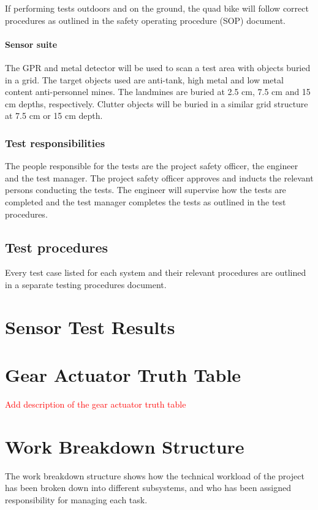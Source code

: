 \documentclass[main.tex]{subfiles}
\begin{document}
\begin{appendices}
If performing tests outdoors and on the ground, the quad bike will follow correct procedures as outlined in the safety operating procedure (SOP) document. 

\subsubsection{Sensor suite}
The GPR and metal detector will be used to scan a test area with objects buried in a grid. The target objects used are anti-tank, high metal and low metal content anti-personnel mines. The landmines are buried at 2.5 cm, 7.5 cm and 15 cm depths,  respectively. Clutter objects will be buried in a similar grid structure at 7.5 cm or 15 cm depth.

\subsection{Test responsibilities}
The people responsible for the tests are the project safety officer, the engineer and the test manager. The project safety officer approves and inducts the relevant persons conducting the tests. The engineer will supervise how the tests are completed and the test manager completes the tests as outlined in the test procedures.  

\section{Test procedures}
Every test case listed for each system and their relevant procedures are outlined in a separate testing procedures document.

\chapter{Sensor Test Results}

\chapter{Gear Actuator Truth Table}
\textcolor{red}{Add description of the gear actuator truth table}


\chapter{Work Breakdown Structure}
The work breakdown structure shows how the technical workload of the project has been broken down into different  subsystems, and who has been assigned responsibility for managing each task. 


\end{appendices}
\end{document}

